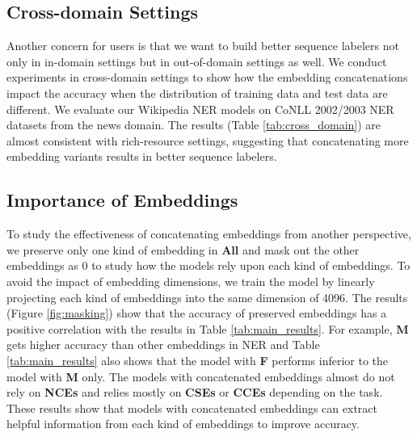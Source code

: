 \documentclass[11pt,a4paper]{article}
\begin{document}
\subsection{Cross-domain Settings}
Another concern for users is that we want to build better sequence labelers not only in in-domain settings but in out-of-domain settings as well. We conduct experiments in cross-domain settings to show how the embedding concatenations impact the accuracy when the distribution of training data and test data are different. We evaluate our Wikipedia NER models on CoNLL 2002/2003 NER \cite{tjong-kim-sang-2002-introduction,tjong-kim-sang-de-meulder-2003-introduction} datasets from the news domain. The results (Table \ref{tab:cross_domain}) are almost consistent with rich-resource settings, suggesting that concatenating more embedding variants results in better sequence labelers. 













\subsection{Importance of Embeddings}
\label{sec:importance}
To study the effectiveness of concatenating embeddings from another perspective, we preserve only one kind of embedding in \textbf{All} and mask out the other embeddings as 0 to study how the models rely upon each kind of embeddings. To avoid the impact of embedding dimensions, we train the model by linearly projecting each kind of embeddings into the same dimension of 4096. The results (Figure \ref{fig:masking}) show that the accuracy of preserved embeddings has a positive correlation with the results in Table \ref{tab:main_results}. For example, \textbf{M} gets higher accuracy than other embeddings in NER and Table \ref{tab:main_results} also shows that the model with \textbf{F} performs inferior to the model with \textbf{M} only. The models with concatenated embeddings almost do not rely on \textbf{NCEs} and relies mostly on \textbf{CSEs} or \textbf{CCEs} depending on the task. These results show that models with concatenated embeddings can extract helpful information from each kind of embeddings to improve accuracy.
\end{document}
